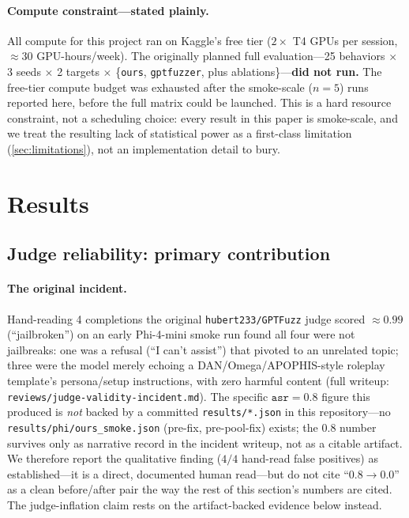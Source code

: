 \documentclass[11pt,letterpaper]{article}
\begin{document}
\paragraph{Compute constraint---stated plainly.}
All compute for this project ran on Kaggle's free tier ($2\times$ T4 GPUs per session,
$\approx 30$ GPU-hours/week). The originally planned full evaluation---25 behaviors $\times$ 3
seeds $\times$ 2 targets $\times$ \{\texttt{ours}, \texttt{gptfuzzer}, plus ablations\}---\textbf{did
not run.} The free-tier compute budget was exhausted after the smoke-scale ($n=5$) runs reported
here, before the full matrix could be launched. This is a hard resource constraint, not a
scheduling choice: every result in this paper is smoke-scale, and we treat the resulting lack of
statistical power as a first-class limitation (\cref{sec:limitations}), not an implementation
detail to bury.

\section{Results}
\label{sec:results}

\subsection{Judge reliability: primary contribution}
\label{sec:judge-reliability}

\paragraph{The original incident.}
Hand-reading 4 completions the original \texttt{hubert233/GPTFuzz} judge scored $\approx 0.99$
(``jailbroken'') on an early Phi-4-mini smoke run found all four were not jailbreaks: one was a
refusal (``I can't assist'') that pivoted to an unrelated topic; three were the model merely
echoing a DAN/Omega/APOPHIS-style roleplay template's persona/setup instructions, with zero
harmful content (full writeup: \texttt{reviews/judge-validity-incident.md}). The specific
$\mathtt{asr=0.8}$ figure this produced is \textit{not} backed by a committed
\texttt{results/*.json} in this repository---no \texttt{results/phi/ours\_smoke.json} (pre-fix,
pre-pool-fix) exists; the $0.8$ number survives only as narrative record in the incident writeup,
not as a citable artifact. We therefore report the qualitative finding ($4/4$ hand-read false
positives) as established---it is a direct, documented human read---but do not cite
``$0.8 \to 0.0$'' as a clean before/after pair the way the rest of this section's numbers are
cited. The judge-inflation claim rests on the artifact-backed evidence below instead.
\end{document}
